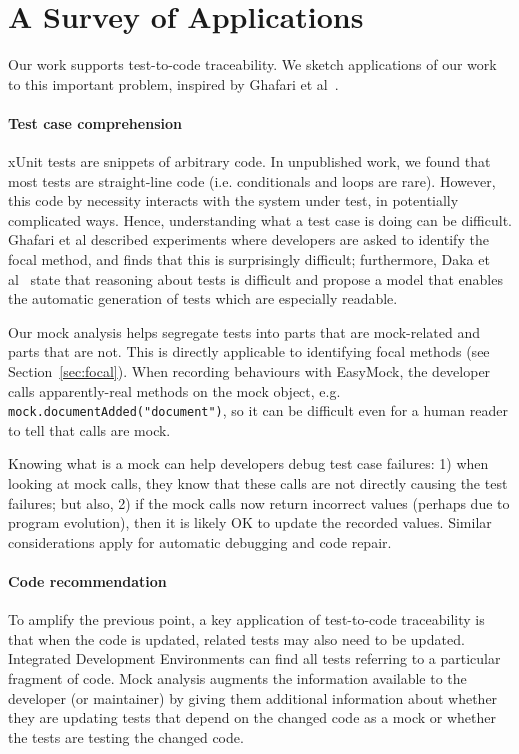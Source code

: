 \section{A Survey of Applications}
\label{sec:applications}

Our work supports test-to-code traceability. 
We sketch applications of our work to this important problem,
inspired by Ghafari et al~\cite{ghafari15:_autom}.

\paragraph{Test case comprehension} xUnit tests are snippets of arbitrary
code. In unpublished work, we found that most tests are
straight-line code (i.e. conditionals and loops are rare). 
However, this code by necessity interacts with
the system under test, in potentially complicated ways. Hence,
understanding what a test case is doing can be difficult. Ghafari et
al described experiments where developers are asked to identify the
focal method, and finds that this is surprisingly difficult;
furthermore, Daka et al~\cite{daka15:_model_readab_improv_unit_tests}
state that reasoning about tests is difficult and propose a model that
enables the automatic generation of tests which are especially
readable.

Our mock analysis helps segregate tests into parts that are
mock-related and parts that are not. This is directly applicable
to identifying focal methods (see Section~\ref{sec:focal}).
When recording behaviours with EasyMock,
the developer calls apparently-real methods on the mock object, e.g. 
\texttt{mock.documentAdded("document")}, so it can be difficult even for a
human reader to tell that calls are mock.

Knowing what is a mock can help developers debug test case
failures: 1) when looking at
mock calls, they know that these calls are not
directly causing the test failures; but also, 2) if the mock calls
now return incorrect values (perhaps due to program evolution),
then it is likely OK to update the recorded values. 
Similar considerations
apply for automatic debugging and code repair.

\paragraph{Code recommendation}
To amplify the previous point, a key application of test-to-code
traceability is that when the code is updated, related tests may also
need to be updated. Integrated Development Environments can find
all tests referring to a particular fragment of code. Mock analysis
augments the information available to the developer (or maintainer) by
giving them additional information about whether they are updating
tests that depend on the changed code as a mock or whether the tests
are testing the changed code.

